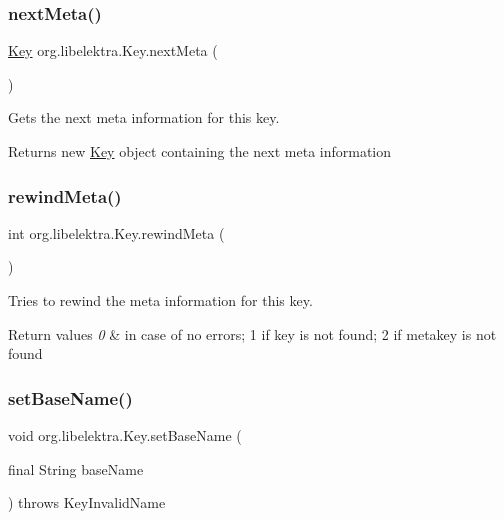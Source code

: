 \subsubsection{\texorpdfstring{next\+Meta()}{nextMeta()}}
{\footnotesize\ttfamily \hyperlink{classorg_1_1libelektra_1_1Key}{Key} org.\+libelektra.\+Key.\+next\+Meta (\begin{DoxyParamCaption}{ }\end{DoxyParamCaption})\hspace{0.3cm}{\ttfamily [inline]}}



Gets the next meta information for this key. 

\begin{DoxyReturn}{Returns}
new \hyperlink{classorg_1_1libelektra_1_1Key}{Key} object containing the next meta information 
\end{DoxyReturn}
\mbox{\label{classorg_1_1libelektra_1_1Key_aea5c4a3a24237dca57e55beca85db0be}} 
\subsubsection{\texorpdfstring{rewind\+Meta()}{rewindMeta()}}
{\footnotesize\ttfamily int org.\+libelektra.\+Key.\+rewind\+Meta (\begin{DoxyParamCaption}{ }\end{DoxyParamCaption})\hspace{0.3cm}{\ttfamily [inline]}}



Tries to rewind the meta information for this key. 


\begin{DoxyRetVals}{Return values}
{\em 0} & in case of no errors; 1 if key is not found; 2 if metakey is not found \\
\hline
\end{DoxyRetVals}
\mbox{\label{classorg_1_1libelektra_1_1Key_a5226472bedc6a02dee826ee3facdb25f}} 
\subsubsection{\texorpdfstring{set\+Base\+Name()}{setBaseName()}}
{\footnotesize\ttfamily void org.\+libelektra.\+Key.\+set\+Base\+Name (\begin{DoxyParamCaption}\item[{final String}]{base\+Name }\end{DoxyParamCaption}) throws Key\+Invalid\+Name\hspace{0.3cm}{\ttfamily [inline]}}



